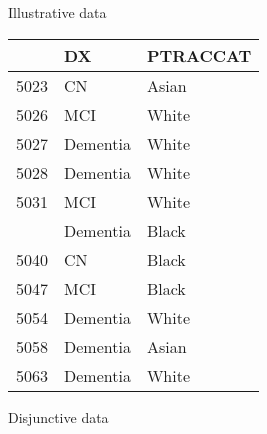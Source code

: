 \documentclass[
  ignorenonframetext,
]{beamer}
\begin{document}
\begin{frame}{Illustrative data}
\protect\hypertarget{illustrative-data}{}

\begin{table}[H]
\centering\begingroup\fontsize{10}{12}\selectfont

\begin{tabular}{lll}
\toprule
  & DX & PTRACCAT\\
\midrule
5023 & CN & Asian\\
5026 & MCI & White\\
5027 & Dementia & White\\
5028 & Dementia & White\\
5031 & MCI & White\\
\addlinespace
5037 & Dementia & Black\\
5040 & CN & Black\\
5047 & MCI & Black\\
5054 & Dementia & White\\
5058 & Dementia & Asian\\
5063 & Dementia & White\\
\bottomrule
\end{tabular}\endgroup{}
\end{table}

\end{frame}

\begin{frame}{Disjunctive data}
\protect\hypertarget{disjunctive-data}{}

\begin{table}[H]
\centering
{}
\end{table}

\end{frame}
\end{document}
